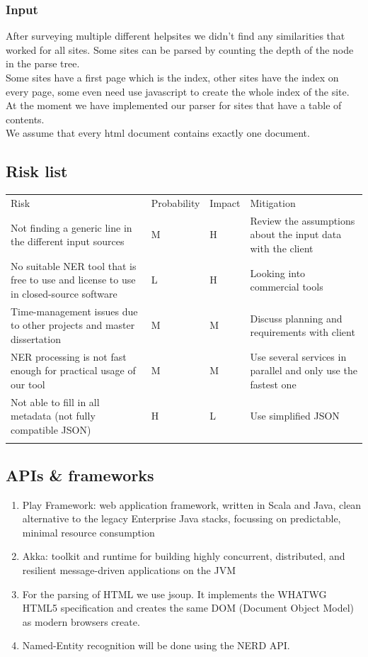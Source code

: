 \documentclass[a4paper,12pt]{article}
\newcommand{\headcol}{\rowcolor{tableheadcolor}} %
\newcommand{\rowcol}{\rowcolor{tablerowcolor}} %
\newcommand{\topline}{\arrayrulecolor{black}\specialrule{0.1em}{\abovetopsep}{0pt}%
            \arrayrulecolor{tableheadcolor}\specialrule{\belowrulesep}{0pt}{0pt}%
            \arrayrulecolor{black}}
\newcommand{\midline}{\arrayrulecolor{tableheadcolor}\specialrule{\aboverulesep}{0pt}{0pt}%
            \arrayrulecolor{black}\specialrule{\lightrulewidth}{0pt}{0pt}%
            \arrayrulecolor{white}\specialrule{\belowrulesep}{0pt}{0pt}%
            \arrayrulecolor{black}}
\newcommand{\bottomlinec}{\arrayrulecolor{tablerowcolor}\specialrule{\aboverulesep}{0pt}{0pt}%
            \arrayrulecolor{black}\specialrule{\heavyrulewidth}{0pt}{\belowbottomsep}}%
\begin{document}
\subsubsection{Input}
After surveying multiple different helpsites we didn't find any similarities that worked for all sites.
Some sites can be parsed by counting the depth of the node in the parse tree.\\
Some sites have a first page which is the index, other sites have the index on every page, some even need use javascript to create the whole index of the site.\\

At the moment we have implemented our parser for sites that have a table of contents.\\
We assume that every html document contains exactly one document.
\subsection{Risk list}
\begin{tabular}{p{5.5cm}llp{5.5cm}}
  \topline
  \headcol Risk & Probability & Impact & Mitigation  \\
  \midline
 \rowcol Not finding a generic line in the different input sources & M & H & Review the assumptions about the input data with the client\\
No suitable NER tool that is free to use and license to use in closed-source software & L & H & Looking into commercial tools\\
 \rowcol Time-management issues due to other projects and master dissertation & M & M & Discuss planning and requirements with client\\
 NER processing is not fast enough for practical usage of our tool & M & M & Use several services in parallel and only use the fastest one\\
 \rowcol Not able to fill in all metadata (not fully compatible JSON) & H & L & Use simplified JSON\\
  \bottomlinec
\end{tabular}
\subsection{APIs \& frameworks}
\begin{enumerate}
\item Play Framework: web application framework, written in Scala and Java, clean alternative to the legacy Enterprise Java stacks, focussing on predictable, minimal resource consumption
\item Akka: toolkit and runtime for building highly concurrent, distributed, and resilient message-driven applications on the JVM
\item For the parsing of HTML we use jsoup. It implements the WHATWG HTML5 specification and creates the same DOM (Document Object Model) as modern browsers create.
\item Named-Entity recognition will be done using the NERD API.
\end{enumerate}
\end{document}
